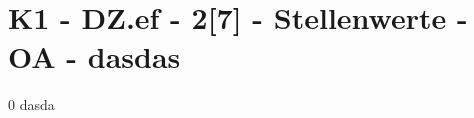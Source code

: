 \section{K1 - DZ.ef - 2[7] - Stellenwerte - OA - dasdas}

\begin{langesbeispiel}\item[0] %
dasda

\end{langesbeispiel}